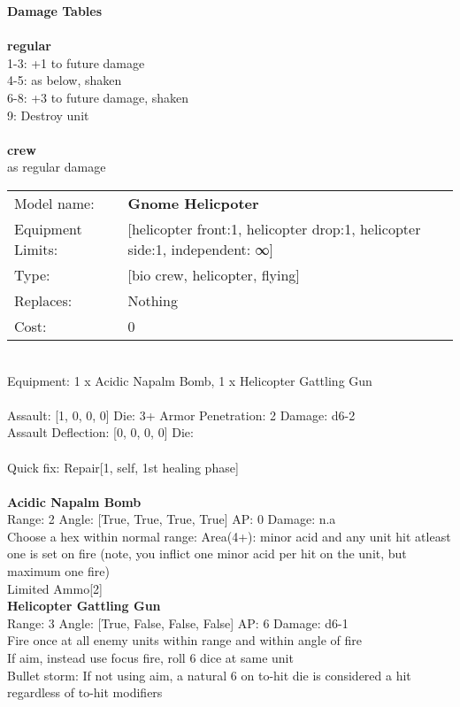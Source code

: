 {\bf Damage Tables} \\
\ \\ {\bf regular } \\
1-3: +1 to future damage \\
4-5: as below, shaken \\
6-8: +3 to future damage, shaken \\
9: Destroy unit \\
\ \\ {\bf crew } \\
as regular damage \\


\noindent
\begin{tabular}{ll}
Model name: &{\bf Gnome Helicpoter } \\
Equipment Limits: &[helicopter front:1, helicopter drop:1, helicopter side:1, independent: ∞] \\
Type: &[bio crew, helicopter, flying] \\
Replaces: &Nothing \\
Cost: & 0\\
\end{tabular}
\ \\
Equipment: 1 x Acidic Napalm Bomb, 1 x Helicopter Gattling Gun \\
\ \\
Assault: [1, 0, 0, 0] Die: 3+ Armor Penetration: 2 Damage: d6-2 \\
Assault Deflection: [0, 0, 0, 0] Die: \\
\indent  
\ \\
Quick fix: Repair[1, self, 1st healing phase]\\ 

\ \\
{\bf Acidic Napalm Bomb } \\



Range: 2  Angle: [True, True, True, True] AP: 0 Damage: n.a \\
Choose a hex within normal range: Area(4+): minor acid and any unit hit atleast one is set on fire (note, you inflict one minor acid per hit on the unit, but maximum one fire)\\ 
Limited Ammo[2]\\ 




{\bf Helicopter Gattling Gun } \\



Range: 3  Angle: [True, False, False, False] AP: 6 Damage: d6-1 \\
Fire once at all enemy units within range and within angle of fire\\ 
If aim, instead use focus fire, roll 6 dice at same unit\\ 
Bullet storm: If not using aim, a natural 6 on to-hit die is considered a hit regardless of to-hit modifiers\\ 




